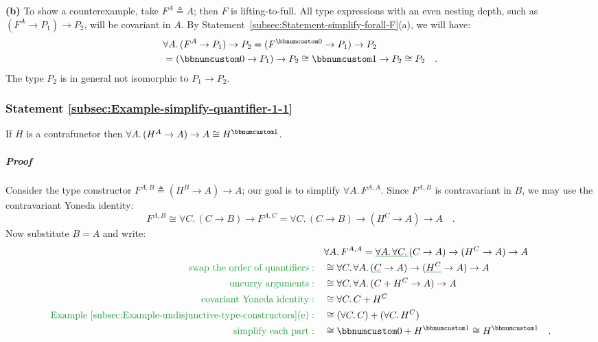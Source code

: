 \textbf{(b)} To show a counterexample, take $F^{A}\triangleq A$;
then $F$ is lifting-to-full. All type expressions with an even nesting
depth, such as $(F^{A}\rightarrow P_{1})\rightarrow P_{2}$, will
be covariant in $A$. By Statement~\ref{subsec:Statement-simplify-forall-F}(a),
we will have:
\begin{align*}
 & \forall A.\,(F^{A}\rightarrow P_{1})\rightarrow P_{2}=(F^{\bbnum 0}\rightarrow P_{1})\rightarrow P_{2}\\
 & =(\bbnum 0\rightarrow P_{1})\rightarrow P_{2}\cong\bbnum 1\rightarrow P_{2}\cong P_{2}\quad.
\end{align*}
The type $P_{2}$ is in general not isomorphic to $P_{1}\rightarrow P_{2}$.

\subsubsection{Statement \label{subsec:Example-simplify-quantifier-1-1}\ref{subsec:Example-simplify-quantifier-1-1}}

If $H$ is a contrafunctor then $\forall A.\,(H^{A}\rightarrow A)\rightarrow A\cong H^{\bbnum 1}$.

\subparagraph{Proof}

Consider the type constructor $F^{A,B}\triangleq(H^{B}\rightarrow A)\rightarrow A$;
our goal is to simplify $\forall A.\,F^{A,A}$. Since $F^{A,B}$ is
contravariant in $B$, we may use the contravariant Yoneda identity:
\[
F^{A,B}\cong\forall C.\,(C\rightarrow B)\rightarrow F^{A,C}=\forall C.\,(C\rightarrow B)\rightarrow(H^{C}\rightarrow A)\rightarrow A\quad.
\]
Now substitute $B=A$ and write:
\begin{align*}
 & \forall A.\,F^{A,A}=\gunderline{\forall A.\,\forall C.\,}(C\rightarrow A)\rightarrow(H^{C}\rightarrow A)\rightarrow A\\
{\color{greenunder}\text{swap the order of quantifiers}:}\quad & \cong\forall C.\,\forall A.\,(\gunderline C\rightarrow A)\rightarrow(\gunderline{H^{C}}\rightarrow A)\rightarrow A\\
{\color{greenunder}\text{uncurry arguments}:}\quad & \cong\forall C.\,\forall A.\,(C+H^{C}\rightarrow A)\rightarrow A\\
{\color{greenunder}\text{covariant Yoneda identity}:}\quad & \cong\forall C.\,C+H^{C}\\
{\color{greenunder}\text{Example \ref{subsec:Example-undisjunctive-type-constructors}(e)}:}\quad & \cong(\forall C.\,C)+(\forall C.\,H^{C})\\
{\color{greenunder}\text{simplify each part}:}\quad & \cong\bbnum 0+H^{\bbnum 1}\cong H^{\bbnum 1}\quad.
\end{align*}


